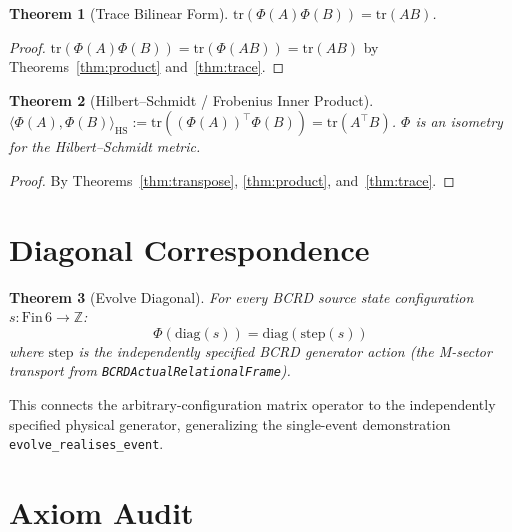 \documentclass[12pt,a4paper]{article}
\newtheorem{theorem}{Theorem}[section]
\begin{document}
\begin{theorem}[Trace Bilinear Form]\label{thm:trace-form}
$\mathrm{tr}(\Phi(A) \Phi(B)) = \mathrm{tr}(A B)$.
\end{theorem}

\begin{proof}
$\mathrm{tr}(\Phi(A)\Phi(B)) = \mathrm{tr}(\Phi(AB))
= \mathrm{tr}(AB)$ by Theorems~\ref{thm:product} and~\ref{thm:trace}.
\end{proof}

\begin{theorem}[Hilbert--Schmidt / Frobenius Inner Product]\label{thm:hs}
$\langle \Phi(A), \Phi(B) \rangle_{\mathrm{HS}} :=
\mathrm{tr}((\Phi(A))^\top \Phi(B)) = \mathrm{tr}(A^\top B)$.
$\Phi$ is an isometry for the Hilbert--Schmidt metric.
\end{theorem}

\begin{proof}
By Theorems~\ref{thm:transpose}, \ref{thm:product}, and~\ref{thm:trace}.
\end{proof}

\section{Diagonal Correspondence}

\begin{theorem}[Evolve Diagonal]\label{thm:diag}
For every BCRD source state configuration $s : \mathrm{Fin}\, 6 \to \mathbb{Z}$:
\[
\Phi(\mathrm{diag}(s)) = \mathrm{diag}(\text{step}(s))
\]
where $\text{step}$ is the independently specified BCRD generator action
(the M-sector transport from \texttt{BCRDActualRelationalFrame}).
\end{theorem}

This connects the arbitrary-configuration matrix operator to the
independently specified physical generator, generalizing the single-event
demonstration \texttt{evolve\_realises\_event}.

\section{Axiom Audit}
\end{document}
